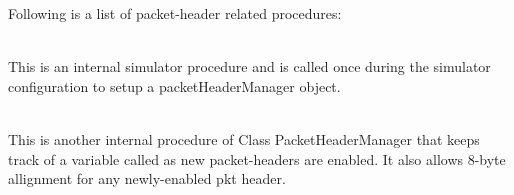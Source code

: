Following is a list of packet-header related procedures:
\begin{flushleft}
\\
This is an internal simulator procedure and is called once during the simulator
configuration to setup a packetHeaderManager object.


\\
This is another internal procedure of Class PacketHeaderManager that keeps track
of a variable called  as new packet-headers are enabled. It also
allows 8-byte allignment for any newly-enabled pkt header.

\end{flushleft}
\endinput
